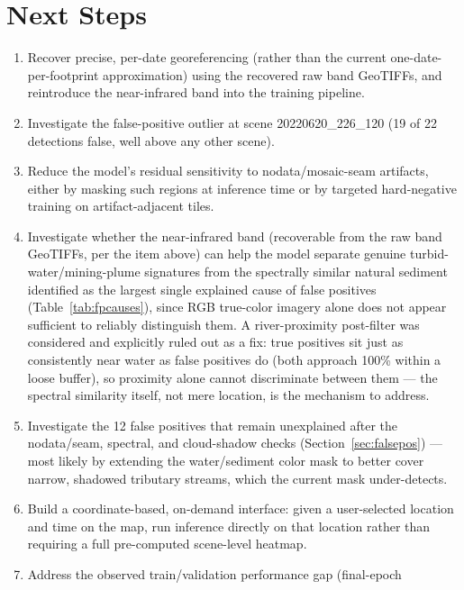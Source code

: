 \documentclass[11pt,a4paper]{article}
\begin{document}
\section{Next Steps}
\label{sec:nextsteps}

\begin{enumerate}[nosep]
  \item Recover precise, per-date georeferencing (rather than the current
        one-date-per-footprint approximation) using the recovered raw band
        GeoTIFFs, and reintroduce the near-infrared band into the training
        pipeline.
  \item Investigate the false-positive outlier at scene
        20220620\_226\_120 (19 of 22 detections false, well above any other
        scene).
  \item Reduce the model's residual sensitivity to nodata/mosaic-seam
        artifacts, either by masking such regions at inference time or by
        targeted hard-negative training on artifact-adjacent tiles.
  \item Investigate whether the near-infrared band (recoverable from the
        raw band GeoTIFFs, per the item above) can help the model
        separate genuine turbid-water/mining-plume signatures from the
        spectrally similar natural sediment identified as the largest
        single explained cause of false positives (Table~\ref{tab:fpcauses}),
        since RGB true-color imagery alone does not appear sufficient to
        reliably distinguish them. A river-proximity post-filter was
        considered and explicitly ruled out as a fix: true positives sit
        just as consistently near water as false positives do (both
        approach 100\% within a loose buffer), so proximity alone cannot
        discriminate between them --- the spectral similarity itself, not
        mere location, is the mechanism to address.
  \item Investigate the 12 false positives that remain unexplained after
        the nodata/seam, spectral, and cloud-shadow checks
        (Section~\ref{sec:falsepos}) --- most likely by extending the
        water/sediment color mask to better cover narrow, shadowed
        tributary streams, which the current mask under-detects.
  \item Build a coordinate-based, on-demand interface: given a
        user-selected location and time on the map, run inference directly
        on that location rather than requiring a full pre-computed
        scene-level heatmap.
  \item Address the observed train/validation performance gap (final-epoch

\end{enumerate}
\end{document}
